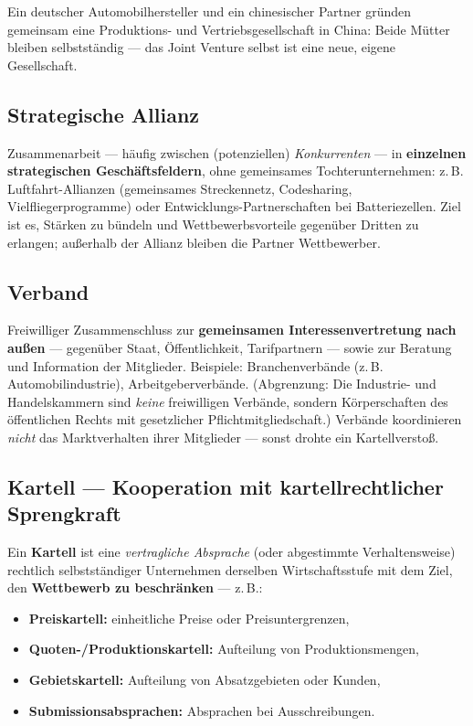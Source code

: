 \documentclass[11pt, a4paper]{article}
\begin{document}
\begin{beispiel}
Ein deutscher Automobilhersteller und ein chinesischer Partner gründen gemeinsam eine
Produktions- und Vertriebsgesellschaft in China: Beide Mütter bleiben selbstständig ---
das Joint Venture selbst ist eine neue, eigene Gesellschaft.
\end{beispiel}

\subsection{Strategische Allianz}

Zusammenarbeit --- häufig zwischen (potenziellen) \emph{Konkurrenten} --- in
\textbf{einzelnen strategischen Geschäftsfeldern}, ohne gemeinsames
Tochterunternehmen: z.\,B. Luftfahrt-Allianzen (gemeinsames Streckennetz, Codesharing,
Vielfliegerprogramme) oder Entwicklungs-Partnerschaften bei Batteriezellen. Ziel ist es,
Stärken zu bündeln und Wettbewerbsvorteile gegenüber Dritten zu erlangen; außerhalb der
Allianz bleiben die Partner Wettbewerber.

\subsection{Verband}

Freiwilliger Zusammenschluss zur \textbf{gemeinsamen Interessenvertretung nach außen} ---
gegenüber Staat, Öffentlichkeit, Tarifpartnern --- sowie zur Beratung und Information der
Mitglieder. Beispiele: Branchenverbände (z.\,B. Automobilindustrie), Arbeitgeberverbände.
(Abgrenzung: Die Industrie- und Handelskammern sind \emph{keine} freiwilligen Verbände,
sondern Körperschaften des öffentlichen Rechts mit gesetzlicher Pflichtmitgliedschaft.)
Verbände koordinieren \emph{nicht} das
Marktverhalten ihrer Mitglieder --- sonst drohte ein Kartellverstoß.

\subsection{Kartell --- Kooperation mit kartellrechtlicher Sprengkraft}

Ein \textbf{Kartell} ist eine \emph{vertragliche Absprache} (oder abgestimmte
Verhaltensweise) rechtlich selbstständiger Unternehmen derselben Wirtschaftsstufe mit dem
Ziel, den \textbf{Wettbewerb zu beschränken} --- z.\,B.:

\begin{itemize}
  \item \textbf{Preiskartell:} einheitliche Preise oder Preisuntergrenzen,
  \item \textbf{Quoten-/Produktionskartell:} Aufteilung von Produktionsmengen,
  \item \textbf{Gebietskartell:} Aufteilung von Absatzgebieten oder Kunden,
  \item \textbf{Submissionsabsprachen:} Absprachen bei Ausschreibungen.
\end{itemize}
\end{document}
